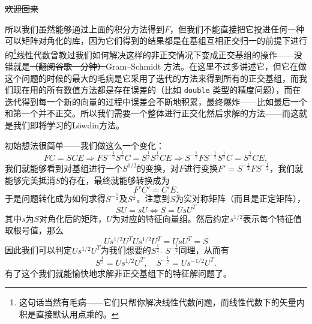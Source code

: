 \documentclass[12pt,a4paper,openany,twoside]{article}
\numberwithin{equation}{section}
\begin{document}
                \sout{欢迎回来}

                所以我们虽然能够通过上面的积分方法得到$F$，但我们不能直接把它投进任何一种可以矩阵对角化的库，因为它们得到的结果都是在基组互相正交归一的前提下进行的\footnote{这句话当然有毛病——它们只帮你解决线性代数问题，而线性代数下的矢量内积是直接默认用点乘的。}线性代数曾教过我们如何解决这样的非正交情况下变成正交基组的操作——没错就是\sout{（翻阅谷歌一分钟）}Gram–Schmidt 方法。在这里不过多讲述它，但它在做这个问题的时候的最大的毛病是它采用了迭代的方法来得到所有的正交基组，而我们现在用的所有数值方法都是存在误差的（比如 \lstinline$double$ 类型的精度问题），而在迭代得到每一个新的向量的过程中误差会不断地积累，最终爆炸——比如最后一个和第一个并不正交。所以我们需要一个整体进行正交化然后求解的方法——而这就是我们即将学习的L\"owdin方法。

                初始想法很简单——我们做这么一个变化：
                \[
                    FC = SCE \Rightarrow F S^{-\frac{1}{2}}S^{\frac{1}{2}} C = S^{\frac{1}{2}}S^{\frac{1}{2}} C E \Rightarrow S^{-\frac{1}{2}} F S^{-\frac{1}{2}} S^{\frac{1}{2}}C = S^{\frac{1}{2}} C E,
                \] 
                我们就能够看到对基组进行一个$S^{1/2}$的变换，对$F$进行变换$F' = S^{-\frac{1}{2}} F S^{-\frac{1}{2}}$，我们就能够完美抵消$S$的存在，最终就能够转换成为
                \begin{equation}
                    F' C' = C' E.
                \end{equation}
                于是问题转化成为如何求得$S^{-\frac{1}{2}}$及$S^{\frac{1}{2}}$。注意到$S$为实对称矩阵（而且是正定矩阵），
                \begin{equation}
                    S U = s U \Leftrightarrow S = U s U^{T}
                \end{equation}
                其中$s$为$S$对角化后的矩阵，$U$为对应的特征向量组。然后约定$s^{1/2}$表示每个特征值取根号值，那么
                \begin{equation}
                    U s^{1/2} U^{T} U s^{1/2} U^{T} = U s U^{T} = S
                \end{equation}
                因此我们可以判定$U s^{1/2} U^{T}$为我们想要的$S^{\frac{1}{2}}$. $S^{-\frac{1}{2}}$同理，从而有
                \begin{equation}
                    S^{\frac{1}{2}} = U s^{1/2} U^{T}, \quad S^{-\frac{1}{2}} =  U s^{-1/2} U^{T}.
                \end{equation}
                有了这个我们就能愉快地求解非正交基组下的特征解问题了。
\end{document}
